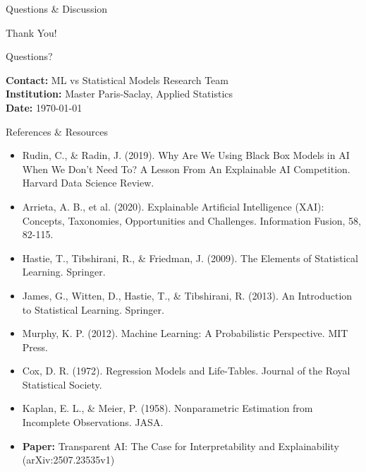 \documentclass[aspectratio=169,10pt]{beamer}
\begin{document}
\begin{frame}{Questions \& Discussion}
\begin{center}
\Huge Thank You!

\vspace{1cm}

\Large Questions?

\vspace{1cm}

\normalsize
\textbf{Contact:} ML vs Statistical Models Research Team\\
\textbf{Institution:} Master Paris-Saclay, Applied Statistics\\
\textbf{Date:} \today
\end{center}
\end{frame}

\begin{frame}{References \& Resources}
\footnotesize
\begin{itemize}
    \item Rudin, C., \& Radin, J. (2019). Why Are We Using Black Box Models in AI When We Don't Need To? A Lesson From An Explainable AI Competition. Harvard Data Science Review.
    \item Arrieta, A. B., et al. (2020). Explainable Artificial Intelligence (XAI): Concepts, Taxonomies, Opportunities and Challenges. Information Fusion, 58, 82-115.
    \item Hastie, T., Tibshirani, R., \& Friedman, J. (2009). The Elements of Statistical Learning. Springer.
    \item James, G., Witten, D., Hastie, T., \& Tibshirani, R. (2013). An Introduction to Statistical Learning. Springer.
    \item Murphy, K. P. (2012). Machine Learning: A Probabilistic Perspective. MIT Press.
    \item Cox, D. R. (1972). Regression Models and Life-Tables. Journal of the Royal Statistical Society.
    \item Kaplan, E. L., \& Meier, P. (1958). Nonparametric Estimation from Incomplete Observations. JASA.
    \item \textbf{Paper:} Transparent AI: The Case for Interpretability and Explainability (arXiv:2507.23535v1)
\end{itemize}


\end{frame}
\end{document}
